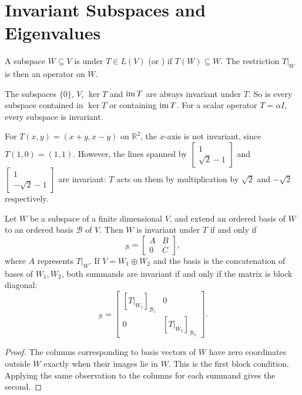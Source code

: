 
\section{Invariant Subspaces and Eigenvalues}\label{sec:Eigenvalues}

\begin{Definition}
A subspace $W\subseteq V$ is  under $T\in L(V)$ (or ) if $T(W)\subseteq W$. The restriction $T|_W$ is then an operator on $W$.
\end{Definition}

\begin{Example}
The subspaces $\{0\}$, $V$, $\ker T$ and $\operatorname{im} T$ are always invariant under $T$. So is every subspace contained in $\ker T$ or containing $\operatorname{im} T$. For a scalar operator $T=\alpha I$, every subspace is invariant.

For $T(x,y)=(x+y,x-y)$ on $\mathbb R^2$, the $x$-axis is not invariant, since $T(1,0)=(1,1)$. However, the lines spanned by $\begin{bmatrix}1\\\sqrt2-1\end{bmatrix}$ and $\begin{bmatrix}1\\-\sqrt2-1\end{bmatrix}$ are invariant: $T$ acts on them by multiplication by $\sqrt2$ and $-\sqrt2$ respectively.
\end{Example}

\begin{Theorem}\label{thm:InvariantBlocks}
Let $W$ be a subspace of a finite dimensional $V$, and extend an ordered basis of $W$ to an ordered basis $\mathcal B$ of $V$. Then $W$ is invariant under $T$ if and only if
\begin{equation*}
[T]_{\mathcal B}=\begin{bmatrix}A&B\\0&C\end{bmatrix},
\end{equation*}
where $A$ represents $T|_W$. If $V=W_1\oplus W_2$ and the basis is the concatenation of bases of $W_1,W_2$, both summands are invariant if and only if the matrix is block diagonal:
\begin{equation*}
[T]_{\mathcal B}=\begin{bmatrix}[T|_{W_1}]_{\mathcal B_1}&0\\0&[T|_{W_2}]_{\mathcal B_2}\end{bmatrix}.
\end{equation*}
\end{Theorem}
\begin{proof}
The columns corresponding to basis vectors of $W$ have zero coordinates outside $W$ exactly when their images lie in $W$. This is the first block condition. Applying the same observation to the columns for each summand gives the second.
\end{proof}

